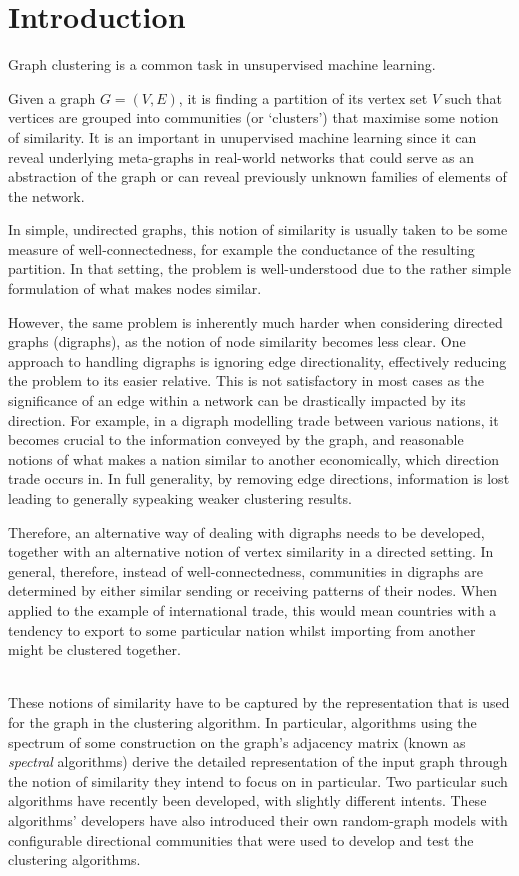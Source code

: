 \chapter{Introduction}

Graph clustering is a common task in unsupervised machine learning.

Given a graph $G = (V, E)$, it is finding a partition of its vertex set $V$ such that vertices are 
grouped into communities (or `clusters') that maximise some notion of 
similarity. It is an important in unupervised machine learning since it can 
reveal underlying meta-graphs in real-world networks that could serve as an abstraction
of the graph or can reveal previously unknown families of elements of the network.

In simple, undirected graphs, this notion of similarity is usually taken to be some 
measure of well-connectedness, for example the conductance of the resulting partition. In that 
setting, the problem is well-understood due to the rather simple formulation of what makes nodes 
similar. 

However, the same problem is inherently much harder when considering directed graphs (digraphs), 
as the notion of node similarity becomes less clear. One approach to handling digraphs is ignoring 
edge directionality, effectively reducing the problem to its easier relative. This is not 
satisfactory in most cases as the significance of an edge within a network can be drastically 
impacted by its direction. For example, in a digraph modelling trade between various nations, it 
becomes crucial to the information conveyed by the graph, and reasonable notions of what makes a 
nation similar to another economically, which direction trade occurs in. In full generality, by 
removing edge directions, information is lost leading to generally sypeaking weaker clustering 
results. 

Therefore, an alternative way of dealing with digraphs needs to be developed, together with an 
alternative notion of vertex similarity in a directed setting. In general, therefore, instead of
well-connectedness, communities in digraphs are determined by either similar sending or receiving 
patterns of their nodes. When applied to the example of international trade, this would mean 
countries with a tendency to export to some particular nation whilst importing from another might 
be clustered together. \\\ 

These notions of similarity have to be captured by the representation that is used for the graph 
in the clustering algorithm. In particular, algorithms using the spectrum of some construction on 
the graph's adjacency matrix (known as \emph{spectral} algorithms) derive the detailed 
representation of the input graph through the notion of similarity they intend to focus on in 
particular. Two particular such algorithms have recently been developed, with slightly different 
intents. These algorithms' developers have also introduced their own random-graph models with 
configurable directional communities that were used to develop and test the clustering algorithms.

